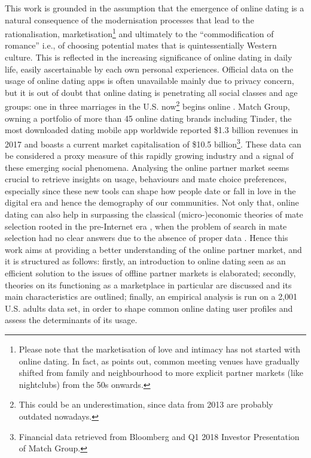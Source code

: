 This work is grounded in the assumption that the emergence of online
dating is a natural consequence of the modernisation processes that
lead to the rationalisation, marketisation\footnote{Please note that the marketisation of love and intimacy has not started
with online dating. In fact, as \citet{Schmitz2016The-Structure-o}
points out, common meeting venues have gradually shifted from family
and neighbourhood to more explicit partner markets (like nightclubs)
from the 50s onwards. } and ultimately to the \textquotedblleft commodification of romance\textquotedblright{}
\textendash{} i.e., of choosing potential mates \citep{Illouz1997Consuming-the-R}
\textendash{} that is quintessentially Western culture. This is reflected
in the increasing significance of online dating in daily life, easily
ascertainable by each own personal experiences. Official data on the
usage of online dating apps is often unavailable mainly due to privacy
concern, but it is out of doubt that online dating is penetrating
all social classes and age groups: one in three marriages in the U.S.
now\footnote{This could be an underestimation, since data from 2013 are probably
outdated nowadays. } begins online \citep{Cacioppo2013Marital-satisfa}. Match Group,
owning a portfolio of more than 45 online dating brands \textendash{}
including Tinder, the most downloaded dating mobile app worldwide
\textendash{} reported \$1.3 billion revenues in 2017 and boasts a
current market capitalisation of \$10.5 billion\footnote{Financial data retrieved from Bloomberg and Q1 2018 Investor Presentation
of Match Group. }. These data can be considered a proxy measure of this rapidly growing
industry and a signal of these emerging social phenomena. Analysing
the online partner market seems crucial to retrieve insights on usage,
behaviours and mate choice preferences, especially since these new
tools can shape how people date or fall in love in the digital era
and hence the demography of our communities. Not only that, online
dating can also help in surpassing the classical (micro-)economic
theories of mate selection rooted in the pre-Internet era \citep{Becker1991A-Treatise-on-t},
when the problem of search in mate selection had no clear answers
due to the absence of proper data \citep{Michael-J.-Rosenfeld2012Searching-for-a}.
Hence this work aims at providing a better understanding of the online
partner market, and it is structured as follows: firstly, an introduction
to online dating seen as an efficient solution to the issues of offline
partner markets is elaborated; secondly, theories on its functioning
\textendash{} as a marketplace in particular \textendash{} are discussed
and its main characteristics are outlined; finally, an empirical analysis
is run on a 2,001 U.S. adults data set, in order to shape common online
dating user profiles and assess the determinants of its usage. 

